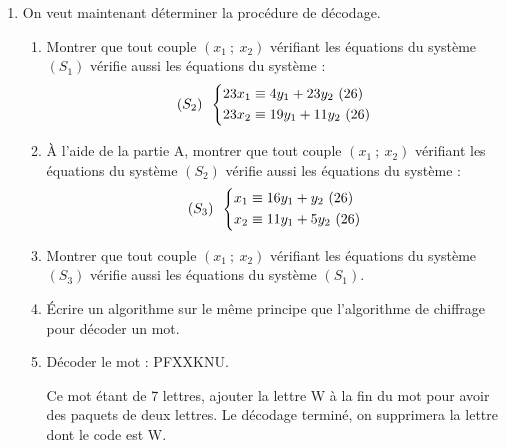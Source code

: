 \begin{TP}
\begin{enumerate}
\item On veut maintenant déterminer la procédure de décodage.
\begin{enumerate}
\item Montrer que tout couple $\left(x_{1}~;~x_{2}\right)$ vérifiant
  les équations du système $\left(S_{1}\right)$ vérifie aussi les
  équations du système :\vspace{-5pt}
$$\left(S_{2}\right)\enskip
\left\{\begin{aligned}
&23x_{1} \equiv 4y_{1} + 23y_{2}~(26)\\ 
&23x_{2} \equiv 19y_{1} + 11y_{2}~(26)
\end{aligned}\right.$$

\item À l'aide de la partie A, montrer que tout couple
  $\left(x_{1}~;~x_{2}\right)$ vérifiant les équations du système
  $\left(S_{2}\right)$ vérifie aussi les équations du système
  :\vspace{-5pt}
$$\left(S_{3}\right)\enskip
\left\{\begin{aligned}
&x_{1} \equiv 16y_{1} + y_{2}~(26)\\
&x_{2} \equiv 11y_{1} + 5y_{2}~(26)
\end{aligned}\right.$$
  
\item Montrer que tout couple $\left(x_{1}~;~x_{2}\right)$ vérifiant
  les équations du système $\left(S_{3}\right)$ vérifie aussi les
  équations du système $\left(S_{1}\right)$.
\item Écrire un algorithme sur le même principe que l'algorithme de chiffrage pour décoder un mot.
\item Décoder le mot : PFXXKNU.
		
Ce mot étant de 7 lettres, ajouter la lettre W à la fin du mot pour avoir des paquets de deux lettres. Le décodage terminé, on supprimera la lettre dont le code est W. 
\end{enumerate}
\end{enumerate}
\end{TP}

